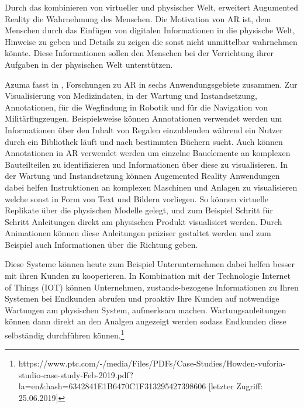 \cite{Azuma.1997} Durch das kombinieren von virtueller und physischer Welt, erweitert Augumented Reality die Wahrnehmung des Menschen. Die Motivation von AR ist, dem Menschen durch das Einfügen
von digitalen Informationen in die physische Welt, Hinweise zu geben und Details zu zeigen die sonst nicht unmittelbar wahrnehmen könnte. Diese Informationen sollen den Menschen 
bei der Verrichtung ihrer Aufgaben in der physischen Welt unterstützen.

Azuma fasst in \cite{Azuma.1997}, Forschungen zu AR in sechs Anwendungsgebiete zusammen. Zur Visualisierung von Medizindaten, in der Wartung 
und Instandsetzung, Annotationen, für die Wegfindung in Robotik und für die Navigation von Militärflugzeugen. Beispielsweise können Annotationen 
verwendet werden um Informationen über den Inhalt von Regalen einzublenden während ein Nutzer durch ein Bibliothek läuft und nach bestimmten Büchern sucht. %
Auch können Annotationen in AR verwendet werden um einzelne Bauelemente an komplexen Bauteilteilen zu identifizieren und Informationen über diese zu visualisieren. 
In der Wartung und Instandsetzung können Augemented Reality Anwendungen dabei helfen Instruktionen an komplexen Maschinen und Anlagen zu visualisieren welche sonst in 
Form von Text und Bildern vorliegen. So können virtuelle Replikate über die physischen Modelle gelegt, und zum Beispiel Schritt für Schritt Anleitungen direkt am physischen Produkt visualisiert werden. 
Durch Animationen können diese Anleitungen präziser gestaltet werden und zum Beispiel auch Informationen über die Richtung geben. 

Diese Systeme können heute zum Beispiel Unterunternehmen dabei helfen besser mit ihren Kunden zu kooperieren. In Kombination mit der Technologie Internet of Things (IOT) können Unternehmen,
zustands-bezogene Informationen zu Ihren Systemen bei Endkunden abrufen und proaktiv Ihre Kunden auf notwendige Wartungen am physischen System, aufmerksam machen. Wartungsanleitungen können dann direkt 
an den Analgen angezeigt werden sodass Endkunden diese selbständig durchführen können.\footnote{https://www.ptc.com/-/media/Files/PDFs/Case-Studies/Howden-vuforia-studio-case-study-Feb-2019.pdf?la=en\&hash=6342841E1B6470C1F313295427398606 [letzter Zugriff: 25.06.2019]}

